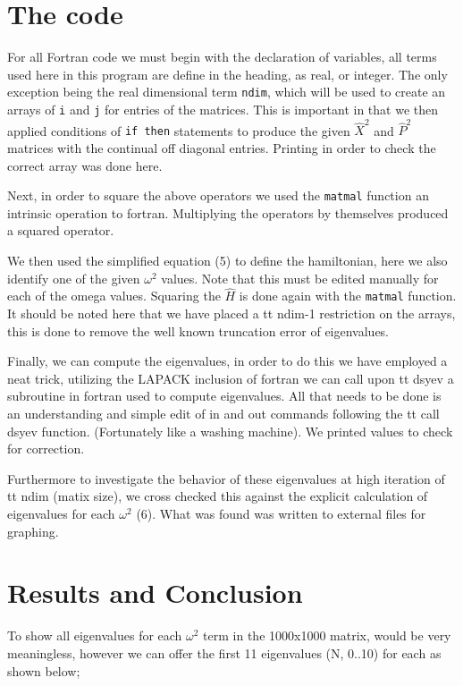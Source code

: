 \documentclass[12pt,letterpaper,notitlepage]{article}
\begin{document}
\section{The code}

For all Fortran code we must begin with the declaration of variables, all terms used here in this program are define in the heading, as real, or integer. The only exception being the real dimensional term {\tt ndim}, which will be used to create an arrays of {\tt i} and {\tt j} for entries of the matrices. This is important in that we then applied conditions of {\tt if then} statements to produce the given $\hat{X}^2$ and $\hat{P}^2$ matrices with the continual off diagonal entries. Printing in order to check the correct array was done here. 

Next, in order to square the above operators we used the {\tt matmal} function an intrinsic operation to fortran. Multiplying the operators by themselves produced a squared operator.    

We then used the simplified equation (5) to define the hamiltonian, here we also identify one of the given $\omega^2$ values. Note that this must be edited manually for each of the omega values. Squaring the $\hat{H}$ is done again with the {\tt matmal} function. It should be noted here that we have placed a {tt ndim-1} restriction on the arrays, this is done to remove the well known truncation error of eigenvalues.     

Finally, we can compute the eigenvalues, in order to do this we have employed a neat trick, utilizing the LAPACK inclusion of fortran we can call upon {tt dsyev} a subroutine in fortran used to compute eigenvalues. All that needs to be done is an understanding and simple edit of in and out commands following the {tt call dsyev} function. (Fortunately like a washing machine). We printed values to check for correction. 

Furthermore to investigate the behavior of these eigenvalues at high iteration of {tt ndim} (matix size), we cross checked this against the explicit calculation of eigenvalues for each $\omega^2$ (6). What was found was written to external files for graphing. 

\section{Results and Conclusion}

To show all eigenvalues for each $\omega^2$ term in the 1000x1000 matrix, would be very meaningless, however we can offer the first 11 eigenvalues (N, 0..10) for each as shown below;  
\end{document}
